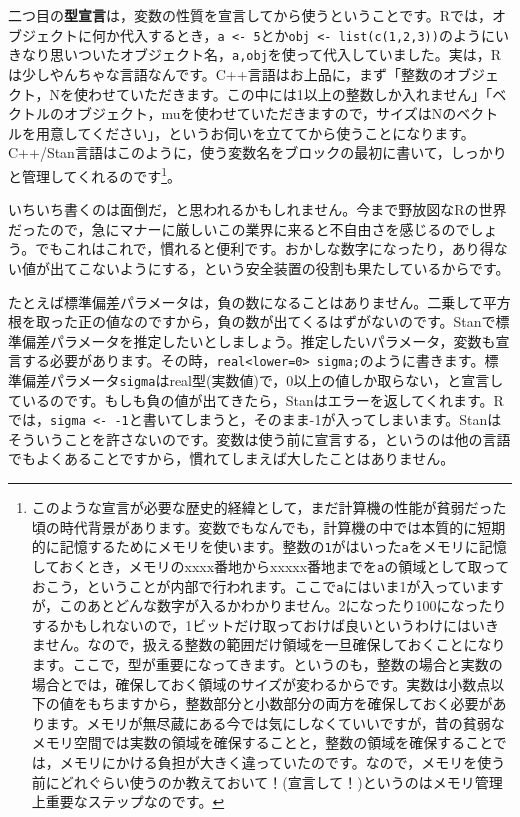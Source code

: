 \documentclass{ltjbook}
\begin{document}
二つ目の\textbf{型宣言}は，変数の性質を宣言してから使うということです。Rでは，オブジェクトに何か代入するとき，\verb|a <- 5|とか\verb|obj <- list(c(1,2,3))|のようにいきなり思いついたオブジェクト名，\verb|a,obj|を使って代入していました。実は，Rは少しやんちゃな言語なんです。C++言語はお上品に，まず「整数のオブジェクト，Nを使わせていただきます。この中には1以上の整数しか入れません」「ベクトルのオブジェクト，muを使わせていただきますので，サイズはNのベクトルを用意してください」，というお伺いを立ててから使うことになります。C++/Stan言語はこのように，使う変数名をブロックの最初に書いて，しっかりと管理してくれるのです\footnote{このような宣言が必要な歴史的経緯として，まだ計算機の性能が貧弱だった頃の時代背景があります。変数でもなんでも，計算機の中では本質的に短期的に記憶するためにメモリを使います。整数の\verb|1|がはいった\verb|a|をメモリに記憶しておくとき，メモリのxxxx番地からxxxxx番地までを\verb|a|の領域として取っておこう，ということが内部で行われます。ここで\verb|a|にはいま1が入っていますが，このあとどんな数字が入るかわかりません。2になったり100になったりするかもしれないので，1ビットだけ取っておけば良いというわけにはいきません。なので，扱える整数の範囲だけ領域を一旦確保しておくことになります。ここで，型が重要になってきます。というのも，整数の場合と実数の場合とでは，確保しておく領域のサイズが変わるからです。実数は小数点以下の値をもちますから，整数部分と小数部分の両方を確保しておく必要があります。メモリが無尽蔵にある今では気にしなくていいですが，昔の貧弱なメモリ空間では実数の領域を確保することと，整数の領域を確保することでは，メモリにかける負担が大きく違っていたのです。なので，メモリを使う前にどれぐらい使うのか教えておいて！(宣言して！)というのはメモリ管理上重要なステップなのです。}。

いちいち書くのは面倒だ，と思われるかもしれません。今まで野放図なRの世界だったので，急にマナーに厳しいこの業界に来ると不自由さを感じるのでしょう。でもこれはこれで，慣れると便利です。おかしな数字になったり，あり得ない値が出てこないようにする，という安全装置の役割も果たしているからです。

たとえば標準偏差パラメータは，負の数になることはありません。二乗して平方根を取った正の値なのですから，負の数が出てくるはずがないのです。Stanで標準偏差パラメータを推定したいとしましょう。推定したいパラメータ，変数も宣言する必要があります。その時，\verb|real<lower=0> sigma;|のように書きます。標準偏差パラメータ\verb|sigma|はreal型(実数値)で，0以上の値しか取らない，と宣言しているのです。もしも負の値が出てきたら，Stanはエラーを返してくれます。Rでは，\verb|sigma <- -1|と書いてしまうと，そのまま-1が入ってしまいます。Stanはそういうことを許さないのです。変数は使う前に宣言する，というのは他の言語でもよくあることですから，慣れてしまえば大したことはありません。
\end{document}
